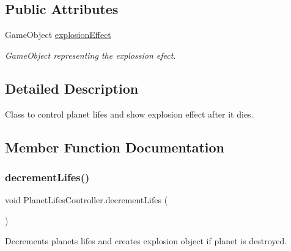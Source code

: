 \subsection*{Public Attributes}
\begin{DoxyCompactItemize}
\item 
Game\+Object \mbox{\hyperlink{class_planet_lifes_controller_a793b98df14aca219bbdeec8fa0a21688}{explosion\+Effect}}
\begin{DoxyCompactList}\small\item\em Game\+Object representing the explossion efect. \end{DoxyCompactList}\end{DoxyCompactItemize}


\subsection{Detailed Description}
Class to control planet lifes and show explosion effect after it dies. 



\subsection{Member Function Documentation}
\mbox{\label{class_planet_lifes_controller_af81b69ec4a2d059ebd24bff38031a466}} 
\subsubsection{\texorpdfstring{decrement\+Lifes()}{decrementLifes()}}
{\footnotesize\ttfamily void Planet\+Lifes\+Controller.\+decrement\+Lifes (\begin{DoxyParamCaption}{ }\end{DoxyParamCaption})}



Decrements planet\textquotesingle{}s lifes and creates explosion object if planet is destroyed. 

\mbox{\label{class_planet_lifes_controller_a5f701b24bb0d90d38d049dec137f90b5}} 
